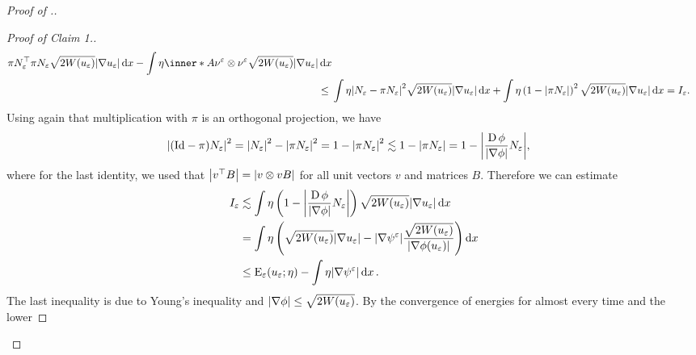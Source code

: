 \begin{proof}[Proof of .]
\begin{proof}[Proof of Claim 1.]
\begin{align*}
{					{ \pi N_{ \varepsilon }^{ \top } \pi N_{ \varepsilon } }
					\sqrt{ 2 W ( u_{ \varepsilon } ) } \abs{ \nabla u_{ 
					\varepsilon } }
				\dd{ x }
				-
				\int
					\eta
					\inner*{ A }
					{ \nu^{ \varepsilon } \otimes \nu^{ \varepsilon } }
					\sqrt{ 2 W ( u_{ \varepsilon } ) }
					\abs{ \nabla u_{ \varepsilon } }
				\dd{ x }
			}
			\\
			\leq{} & 
			\int
				\eta
				\abs{ N_{ \varepsilon } - \pi N_{ \varepsilon } }^{ 2 }
				\sqrt{ 2 W ( u_{ \varepsilon} ) } \abs{ \nabla u_{ \varepsilon 
				} }
			\dd{ x }
			+
			\int
				\eta
				\left( 
					1 - \abs{ \pi N_{ \varepsilon } }
				\right)^{ 2 }
				\sqrt{ 2 W ( u_{ \varepsilon } ) } \abs{ \nabla u_{ \varepsilon 
				} }
			\dd{ x }= I_{ \varepsilon }.
		\end{align*}
		Using again that multiplication with $ \pi $ is an orthogonal 
		projection, we have
		\begin{align*}
			\abs{
				( \mathrm{Id} - \pi ) N_{ \varepsilon }
			}^{ 2 }
			& =
			\abs{ N_{ \varepsilon } }^{ 2 } 
			-
			\abs{ \pi N_{ \varepsilon } }^{ 2 }
			=
			1 - \abs{ \pi N_{ \varepsilon } }^{ 2 }
			\lesssim
			1 - \abs{ \pi N_{ \varepsilon } }
			=
			1 -
			\abs{ \frac{ \operatorname{D} \phi }{ \abs{ \nabla \phi } } N_{ \varepsilon } 
			},
		\end{align*}
		where for the last identity, we used that $ \abs{ v^{ \top } B } = 
		\abs{ v \otimes v B } $ for all unit vectors $ v $ and matrices $ B $.
		Therefore we can estimate
		\begin{align*}
			I_{ \varepsilon }
			& \lesssim
			\int
				\eta
				\left(
					1 - \abs{ \frac{ \operatorname{D} \phi }{ \abs{ \nabla \phi } } N_{ 
					\varepsilon } }
				\right)
				\sqrt{ 2 W ( u_{ \varepsilon } ) }
				\abs{ \nabla u_{ \varepsilon } }
			\dd{ x }
			\\
			& =
			\int
				\eta 
				\left(
					\sqrt{ 2 W ( u_{ \varepsilon } ) }
					\abs{ \nabla u_{ \varepsilon } }
					-
					\abs{ \nabla \psi^{ \varepsilon } }
					\frac{ \sqrt{ 2 W ( u_{ \varepsilon } ) } }{ \abs{ \nabla 
					\phi ( u_{ \varepsilon } ) } }
				\right)
			\dd{ x }
			\\
			& \leq
			\operatorname{E}_{ \varepsilon } ( u_{ \varepsilon } ; \eta )
			-
			\int
				\eta
				\abs{ \nabla \psi^{ \varepsilon } }
			\dd{ x }.
		\end{align*}
		The last inequality is due to Young's inequality and $ \abs{ \nabla 
		\phi } \leq \sqrt{ 2 W ( u_{ \varepsilon } ) } $.
		By the convergence of energies for almost every time and the lower 

\end{proof}
\end{proof}
